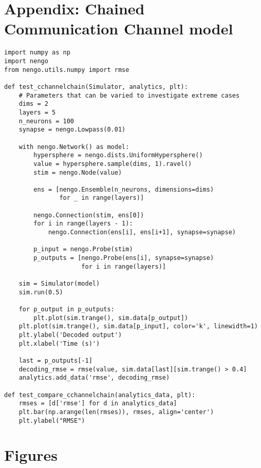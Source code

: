 \documentclass{frontiersSCNS}
\begin{document}



\clearpage

\section*{Appendix: Chained Communication Channel model}

\begin{lstlisting}
import numpy as np
import nengo
from nengo.utils.numpy import rmse

def test_cchannelchain(Simulator, analytics, plt):
    # Parameters that can be varied to investigate extreme cases
    dims = 2
    layers = 5
    n_neurons = 100
    synapse = nengo.Lowpass(0.01)

    with nengo.Network() as model:
        hypersphere = nengo.dists.UniformHypersphere()
        value = hypersphere.sample(dims, 1).ravel()
        stim = nengo.Node(value)

        ens = [nengo.Ensemble(n_neurons, dimensions=dims)
               for _ in range(layers)]

        nengo.Connection(stim, ens[0])
        for i in range(layers - 1):
            nengo.Connection(ens[i], ens[i+1], synapse=synapse)

        p_input = nengo.Probe(stim)
        p_outputs = [nengo.Probe(ens[i], synapse=synapse)
                     for i in range(layers)]

    sim = Simulator(model)
    sim.run(0.5)

    for p_output in p_outputs:
        plt.plot(sim.trange(), sim.data[p_output])
    plt.plot(sim.trange(), sim.data[p_input], color='k', linewidth=1)
    plt.ylabel('Decoded output')
    plt.xlabel('Time (s)')

    last = p_outputs[-1]
    decoding_rmse = rmse(value, sim.data[last][sim.trange() > 0.4]
    analytics.add_data('rmse', decoding_rmse)

def test_compare_cchannelchain(analytics_data, plt):
    rmses = [d['rmse'] for d in analytics_data]
    plt.bar(np.arange(len(rmses)), rmses, align='center')
    plt.ylabel("RMSE")
\end{lstlisting}

\clearpage

\section*{Figures}
\end{document}
